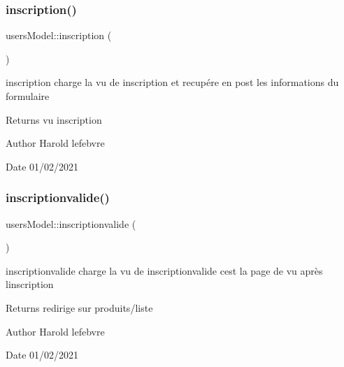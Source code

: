 \subsubsection{\texorpdfstring{inscription()}{inscription()}}
{\footnotesize\ttfamily users\+Model\+::inscription (\begin{DoxyParamCaption}{ }\end{DoxyParamCaption})}



inscription charge la vu de inscription et recupére en post les informations du formulaire 

\begin{DoxyReturn}{Returns}
vu inscription 
\end{DoxyReturn}
\begin{DoxyAuthor}{Author}
Harold lefebvre 
\end{DoxyAuthor}
\begin{DoxyDate}{Date}
01/02/2021 
\end{DoxyDate}
\mbox{\label{classusers_model_a88fadcc257de04e5445083d722b44428}} 
\subsubsection{\texorpdfstring{inscriptionvalide()}{inscriptionvalide()}}
{\footnotesize\ttfamily users\+Model\+::inscriptionvalide (\begin{DoxyParamCaption}{ }\end{DoxyParamCaption})}



inscriptionvalide charge la vu de inscriptionvalide c\textquotesingle{}est la page de vu après l\textquotesingle{}inscription 

\begin{DoxyReturn}{Returns}
redirige sur produits/liste 
\end{DoxyReturn}
\begin{DoxyAuthor}{Author}
Harold lefebvre 
\end{DoxyAuthor}
\begin{DoxyDate}{Date}
01/02/2021 
\end{DoxyDate}
\mbox{\label{classusers_model_a1946ca112e0c07969fa2b46566899e22}} 
